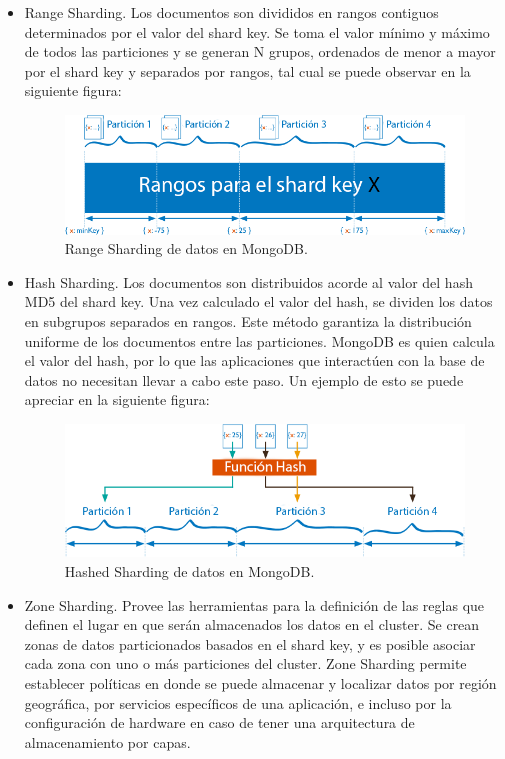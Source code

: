 \begin{itemize}

\item Range Sharding. Los documentos son divididos en rangos contiguos determinados por el valor del shard key. Se toma el valor
mínimo y máximo de todos las particiones y se generan N grupos, ordenados de menor a mayor por el shard key y separados por rangos,
tal cual se puede observar en la siguiente figura:

\begin{figure}[H]
	\centering
		\includegraphics[width=.7\textwidth]{figures/ranged_sharding}
	\caption{Range Sharding de datos en MongoDB.}
	\label{fig:ranged_sharding}
\end{figure}

\item Hash Sharding. Los documentos son distribuidos acorde al valor del hash MD5 del shard key. Una vez calculado el valor del hash, se
dividen los datos en subgrupos separados en rangos. Este método garantiza la distribución uniforme de los documentos entre las particiones.
MongoDB es quien calcula el valor del hash, por lo que las aplicaciones que interactúen con la base de datos no necesitan llevar a cabo este paso. Un ejemplo de esto se puede apreciar en la siguiente figura:

\begin{figure}[H]
	\centering
		\includegraphics[width=.7\textwidth]{figures/hashed_sharding}
	\caption{Hashed Sharding de datos en MongoDB.}
	\label{fig:hashed_sharding}
\end{figure}

\item Zone Sharding. Provee las herramientas para la definición de las reglas que definen el lugar en que serán almacenados los datos
en el cluster. Se crean zonas de datos particionados basados en el shard key, y es posible asociar cada zona con uno o más particiones
del cluster. Zone Sharding permite establecer políticas en donde se puede almacenar y localizar datos por región geográfica, por
servicios específicos de una aplicación, e incluso por la configuración de hardware en caso de tener una arquitectura de almacenamiento
por capas.


\end{itemize}
